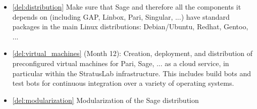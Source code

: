 \begin{Workpackage}{\thewpno}
\begin{WPDeliverables}



    \begin{itemize}




    \item \ref{del:distribution} Make sure that Sage and therefore all the
      components it depends on (including GAP, Linbox, Pari, Singular,
      ...)  have standard packages in the main Linux distributions:
      Debian/Ubuntu, Redhat, Gentoo, ...


    \item \ref{del:virtual_machines} (Month 12): Creation, deployment, and
      distribution of preconfigured virtual machines for Pari, Sage,
      ... as a cloud service, in particular within the StratusLab
      infrastructure. This includes build bots and test bots for
      continuous integration over a variety of operating systems.

    \item \ref{del:modularization} Modularization of the Sage distribution


\end{itemize}
\end{WPDeliverables}
\end{Workpackage}
